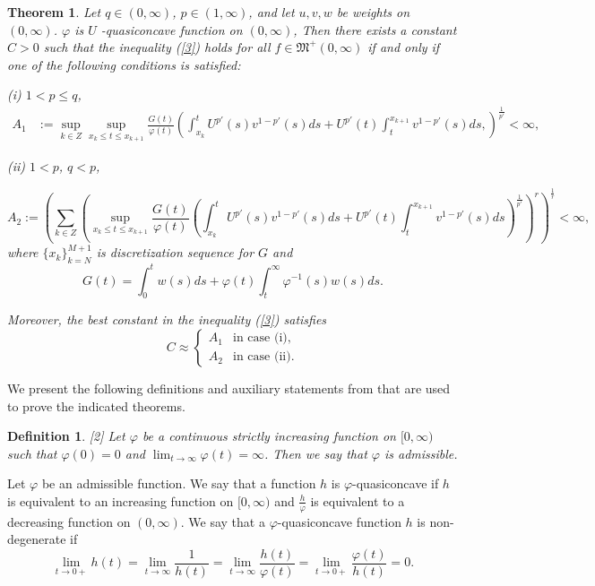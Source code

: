\documentclass[12pt]{article}
\newtheorem{theorem}{\indent Theorem}
\newtheorem{definition}{\indent Definition}
\begin{document}
\begin{theorem}\label{disc.char. 3}
Let  $q\in(0,\infty)$, $p\in(1,\infty)$, and let $u, v, w$ be weights on $(0,\infty)$. $\varphi$ is $U$ -quasiconcave function on $(0, \infty)$, Then there exists a constant $C>0$ such that the inequality (\ref{3}) holds for all $f\in \mathfrak{M}^+(0,\infty)$ if and only if one of the following conditions is satisfied:

\rm(i) $1<p \leq q$,
\begin{align*}
A_1& := \sup_{k\in Z} \sup_{  x_k\le t \le  x_{k+1}} \frac{G(t)}{\varphi(t)} \left(\int_{x_k}^t U^{p'}(s) v^{1-p'}(s)ds +U^{p'}(t)\int_t^{x_{k+1}} v^{1-p'}(s)ds, \right)^{\frac{1}{p'}}<\infty,
\end{align*}

\rm(ii)  $1 < p $,  $q<p$,

\begin{equation*}
A_2 := \left(\sum_{k\in Z} \left(\sup_{  x_k\le  t \le  x_{k+1}} \frac{G(t)}{\varphi(t)} \left(\int_{x_k}^t U^{p'}(s) v^{1-p'}(s)ds +U^{p'}(t)\int_t^{x_{k+1}} v^{1-p'}(s)ds \right)^{\frac{1}{p'}}\right)^r\right)^{\frac{1}{r}}<\infty,
\end{equation*}
where $\{x_k\}_{k=N}^{M+1}$ is discretization sequence for $G$ and
\begin{equation*} \label{34}
G(t)=\int_{0}^{t}w(s)ds+\varphi(t)\int_{t}^{\infty}\varphi^{-1}(s)w(s)ds.
\end{equation*}

Moreover, the best constant in the inequality (\ref{3}) satisfies
\begin{displaymath}
C\approx \left\{ \begin{array}{ll}
A_1 & \textrm{in case  (i),}\\
A_2 & \textrm{in case  (ii).}
\end{array} \right.
\end{displaymath}
\end{theorem}

We present the following definitions and auxiliary statements from \cite{1, 2, 3, 4, 5} that are used to prove the indicated theorems.

\begin{definition}\label{def13} [2]
Let $\varphi$ be a continuous strictly increasing function on
$[0,\infty)$ such that $\varphi(0)=0$ and $\lim_{t\rightarrow\infty}\varphi(t)=\infty$. Then we say that $\varphi$ is admissible.
\end{definition}

Let $\varphi$ be an admissible function. We say that a function $h$ is $\varphi$-quasiconcave if $h$ is equivalent to an increasing function on $[0,\infty)$ and $\frac{h}{\varphi}$ is equivalent to a decreasing function on $(0,\infty)$. We say that a $\varphi$-quasiconcave function $h$ is non-degenerate if
\begin{equation}\lim_{t\rightarrow 0+}h(t)
=\lim_{t\rightarrow\infty}\frac{1}{h(t)}= \lim_{t\rightarrow\infty}\frac{h(t)}{\varphi(t)} =\lim_{t\rightarrow 0+}\frac{\varphi(t)}{h(t)}=0.
\end{equation}
\end{document}
